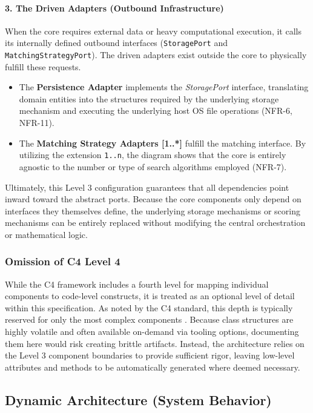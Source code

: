 \paragraph{3. The Driven Adapters (Outbound Infrastructure)}
When the core requires external data or heavy computational execution, it calls its internally defined outbound interfaces (\texttt{StoragePort} and \texttt{MatchingStrategyPort}). The driven adapters exist outside the core to physically fulfill these requests.
\begin{itemize}
    \item The \textbf{Persistence Adapter} implements the \textit{StoragePort} interface, translating domain entities into the structures required by the underlying storage mechanism and executing the underlying host \ac{OS} file operations (NFR-6, NFR-11).
    \item The \textbf{Matching Strategy Adapters [1..*]} fulfill the matching interface. By utilizing the extension \texttt{1..n}, the diagram shows that the core is entirely agnostic to the number or type of search algorithms employed (NFR-7). 
\end{itemize}
\FloatBarrier

Ultimately, this Level 3 configuration guarantees that all dependencies point inward toward the abstract ports. Because the core components only depend on interfaces they themselves define, the underlying storage mechanisms or scoring mechanisms can be entirely replaced without modifying the central orchestration or mathematical logic.

\subsubsection{Omission of C4 Level 4}

While the C4 framework includes a fourth level for mapping individual components to code-level constructs, it is treated as an optional level of detail within this specification. As noted by the C4 standard, this depth is typically reserved for only the most complex components \cite{brown2026c4}. Because class structures are highly volatile and often available on-demand via tooling options\cite{brown2026c4}, documenting them here would risk creating brittle artifacts. Instead, the architecture relies on the Level 3 component boundaries to provide sufficient rigor, leaving low-level attributes and methods to be automatically generated where deemed necessary.

\subsection{Dynamic Architecture (System Behavior)}
\label{sec:dynamic_architecture}

